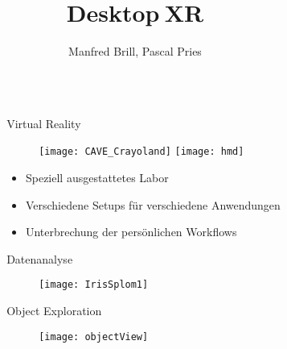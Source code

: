 \documentclass[final,hyperref={pdfpagelabels=false}]{beamer}
\title{\huge Desktop$\:$XR}
\author{Manfred Brill, Pascal Pries}
\institute{Fachbereich Informatik und Mikrosystemtechnik}
\begin{document}

\begin{frame}[t] %

\begin{columns}[t] %

\begin{column}{.02\textwidth}\end{column} %

\begin{column}{.465\textwidth} %


\begin{block}{Virtual Reality}
    \vspace{140px}
    \begin{figure}
        \texttt{[image: CAVE\_Crayoland]}\hspace*{3cm}
        \texttt{[image: hmd]}
    \end{figure}

    \vspace{120px}

\begin{itemize}
\item Speziell ausgestattetes Labor
\item Verschiedene Setups für verschiedene Anwendungen
\item Unterbrechung der persönlichen Workflows
\end{itemize}
\end{block}

\vspace{0.3cm}

\begin{block}{Datenanalyse}
    \begin{figure}
        \texttt{[image: IrisSplom1]}
    \end{figure}
\end{block}

\vspace{2.8cm}

\begin{block}{Object Exploration}
    \begin{figure}
        \texttt{[image: objectView]}
    \end{figure}
\end{block}


\end{column}
\end{columns}
\end{frame}
\end{document}
